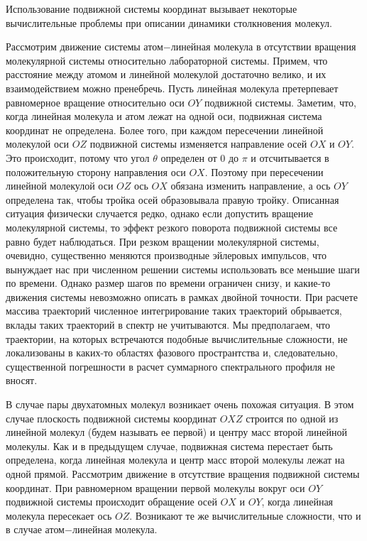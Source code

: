 Использование подвижной системы координат вызывает некоторые вычислительные проблемы при описании динамики столкновения молекул. \par
Рассмотрим движение системы атом$-$линейная молекула в отсутствии вращения молекулярной системы относительно лабораторной системы. Примем, что расстояние между атомом и линейной молекулой достаточно велико, и их взаимодействием можно пренебречь. Пусть линейная молекула претерпевает равномерное вращение относительно оси $OY$ подвижной системы. Заметим, что, когда линейная молекула и атом лежат на одной оси, подвижная система координат не определена. Более того, при каждом пересечении линейной молекулой оси $OZ$ подвижной системы изменяется направление осей $OX$ и $OY$. Это происходит, потому что угол $\theta$ определен от $0$ до $\pi$ и отсчитывается в положительную сторону направления оси $OX$. Поэтому при пересечении линейной молекулой оси $OZ$ ось $OX$ обязана изменить направление, а ось $OY$ определена так, чтобы тройка осей образовывала правую тройку. Описанная ситуация физически случается редко, однако если допустить вращение молекулярной системы, то эффект резкого поворота подвижной системы все равно будет наблюдаться. При резком вращении молекулярной системы, очевидно, существенно меняются производные эйлеровых импульсов, что вынуждает нас при численном решении системы использовать все меньшие шаги по времени. Однако размер шагов по времени ограничен снизу, и какие-то движения системы невозможно описать в рамках двойной точности. При расчете массива траекторий численное интегрирование таких траекторий обрывается, вклады таких траекторий в спектр не учитываются. Мы предполагаем, что траектории, на которых встречаются подобные вычислительные сложности, не локализованы в каких-то областях фазового пространтства и, следовательно, существенной погрешности в расчет суммарного спектрального профиля не вносят. \par
В случае пары двухатомных молекул возникает очень похожая ситуация. В этом случае плоскость подвижной системы координат $OXZ$ строится по одной из линейной молекул (будем называть ее первой) и центру масс второй линейной молекулы. Как и в предыдущем случае, подвижная система перестает быть определена, когда линейная молекула и центр масс второй молекулы лежат на одной прямой. Рассмотрим движение в отсутствие вращения подвижной системы координат. При равномерном вращении первой молекулы вокруг оси $OY$ подвижной системы происходит обращение осей $OX$ и $OY$, когда линейная молекула пересекает ось $OZ$. Возникают те же вычислительные сложности, что и в случае атом$-$линейная молекула. \par
